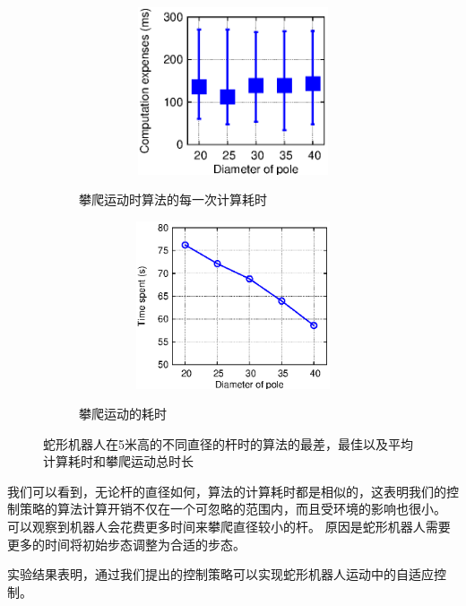 \begin{figure}[htbp]
	\centering
	\begin{subfigure}{0.45\textwidth}{
		\centering
		\includegraphics[width=1\textwidth,height=140pt]{figure/chap05/figCE.eps}
		\label{fig:CE}
		\caption{攀爬运动时算法的每一次计算耗时}
	}
	\end{subfigure}
	\begin{subfigure}{0.45\textwidth}{
		\centering
		\includegraphics[width=1\textwidth,height=140pt]{figure/chap05/TimeSpent.eps}
		\label{fig:TS}
		\caption{攀爬运动的耗时}
	}
	\end{subfigure}
	\caption{蛇形机器人在5米高的不同直径的杆时的算法的最差，最佳以及平均计算耗时和攀爬运动总时长}
	\label{fig:CE-TS}
\end{figure}

我们可以看到，无论杆的直径如何，算法的计算耗时都是相似的，这表明我们的控制策略的算法计算开销不仅在一个可忽略的范围内，而且受环境的影响也很小。 可以观察到机器人会花费更多时间来攀爬直径较小的杆。 原因是蛇形机器人需要更多的时间将初始步态调整为合适的步态。

实验结果表明，通过我们提出的控制策略可以实现蛇形机器人运动中的自适应控制。



